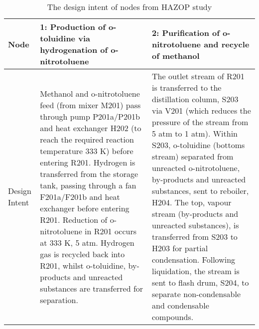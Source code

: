 \begin{table}[h]
\centering
\caption{The design intent of nodes from HAZOP study}
\label{tab:nodes}
\begin{tabularx}{\linewidth}{@{}lXX@{}}
    \toprule
    \textbf{Node}         & \textbf{1: Production of o-toluidine via hydrogenation of o-nitrotoluene}                                                                                                                                                                                                                                                                                                                                                                                                                                 & \textbf{2: Purification of o-nitrotoluene and recycle of methanol}                                                                                                                                                                                                                                                                                                                                                                                                                                                                                  \\ \midrule
    Design Intent         & Methanol and o-nitrotoluene feed (from mixer M201) pass through pump P201a/P201b and heat exchanger H202 (to reach the required reaction temperature 333 K) before entering R201. Hydrogen is transferred from the storage tank, passing through a fan F201a/F201b and heat exchanger before entering R201. Reduction of o-nitrotoluene in R201 occurs at 333 K, 5 atm. Hydrogen gas is recycled back into R201, whilst o-toluidine, by-products and unreacted substances are transferred for separation. & The outlet stream of R201 is transferred to the distillation column, S203 via V201 (which reduces the pressure of the stream from 5 atm to 1 atm). Within S203, o-toluidine (bottoms stream) separated from unreacted o-nitrotoluene, by-products and unreacted substances, sent to reboiler, H204. The top, vapour stream (by-products and unreacted substances), is transferred from S203 to H203 for partial condensation. Following liquidation, the stream is sent to flash drum, S204, to separate non-condensable and condensable compounds. \\ \bottomrule
\end{tabularx}
\end{table}


